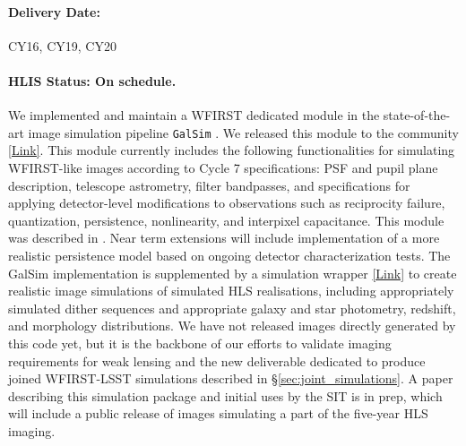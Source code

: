 \paragraph*{Delivery Date:} CY16, CY19, CY20

\paragraph*{HLIS Status: On schedule.} We implemented and maintain a
WFIRST dedicated module in the state-of-the-art image simulation
pipeline \texttt{GalSim} \citep{Rowe:2015}. We released this module to the community
\href{https://github.com/GalSim-developers/GalSim}{[Link]}. This module currently includes the following functionalities for simulating WFIRST-like images according to Cycle 7 specifications: PSF and pupil plane description, telescope astrometry, filter bandpasses, and specifications for applying detector-level modifications to observations such as reciprocity failure, quantization, persistence, nonlinearity, and interpixel capacitance. This module was described in \cite{Kannawadi2016}. Near term extensions will include implementation of a more realistic persistence model based on ongoing detector characterization tests. The GalSim implementation is supplemented by a simulation wrapper \href{https://github.com/matroxel/wfirst_imsim/}{[Link]} to create realistic image simulations of simulated HLS realisations, including appropriately simulated dither sequences and appropriate galaxy and star photometry, redshift, and morphology distributions.  We have not released images directly generated by this code yet, but it is the backbone of our efforts to validate imaging requirements for weak lensing and the new deliverable dedicated to produce joined WFIRST-LSST simulations described in \S\ref{sec:joint_simulations}. A paper describing this simulation package and initial uses by the SIT is in prep, which will include a public release of images simulating a part of the five-year HLS imaging.

